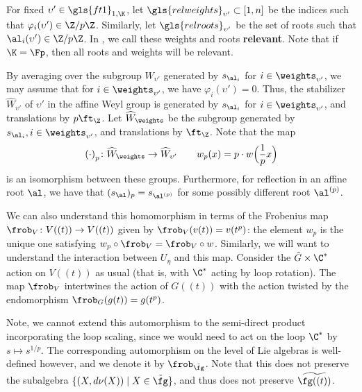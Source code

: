 For fixed $\upsilon'\in \gls{ft1}_{1,\K}$, let $\gls{relweights}_{\upsilon'}\subset
[1,n]$ be the indices such that $\varphi_i(\upsilon')\in \Z/p\Z$.
Similarly, let $\gls{relroots}_{\upsilon'}$ be the set of roots such that
$\al_i(\upsilon') \in \Z/p\Z$. 
In \cite[\S 4]{WebSD}, we call these weights and roots   {\bf
  relevant}.  Note that if $\K=\Fp$, then all roots and weights will
be relevant.   

By averaging over the subgroup $W_{\upsilon'}$ generated by $s_{\al_i}$ for $i\in \weights_{\upsilon'}$, we may assume that for $i
\in  \weights_{\upsilon'}$, we have $\varphi_i(\upsilon')=0$. Thus, the
stabilizer $\widehat{W}_{\upsilon'}$ of $\upsilon'$ in the affine Weyl
group is generated by $s_{\al_i}$ for $i\in \weights_{\upsilon'}$, and 
translations by $p \ft_{\Z}$.  Let $\widehat{W}_{ \weights}$
be the subgroup generated by $s_{\al_i}, i\in \weights_{\upsilon'}$, and 
translations by $\ft_{\Z}$.  Note that the map \[{(\cdot )}_p\colon \widehat{W}_{ \weights} \to \widehat{W}_{\upsilon'} \qquad w_p(x)= p\cdot w\Big(\frac{1}{p}x\Big)\]
is an isomorphism between these groups.  Furthermore, for reflection
in an affine root $\al$, we have that $(s_\al)_p=s_{\al^{(p)}}$ for
some possibly different root $\al^{(p)}$.  

We can also understand this homomorphism in terms of the Frobenius map $\frob_V\colon V((t))\to V((t))$ given by $\frob_V(v(t))=v(t^p)$: the element $w_p$ is the unique one satisfying $w_p\circ \frob_V=\frob_V \circ w$.  Similarly, we will want to understand the interaction between $U_{\eta}$ and this map.  Consider the $\tilde{G}\times \C^*$ action on $V((t))$ as usual (that is, with $\C^*$ acting by loop rotation).  The map $\frob_V$ intertwines the action of 
$G((t))$ with the action twisted by the endomorphism $\frob_G(g(t))=g(t^p)$.

Note, we cannot extend this automorphism to the semi-direct product incorporating the loop scaling, since we would need to act on the loop $\C^*$ by $s\mapsto s^{1/p}$.  The corresponding automorphism on the level of Lie algebras is well-defined however, and we denote it by $\frob_{\tilde{\fg}}$.   Note that this does not preserve the subalgebra $\{(X,d\nu(X))\mid X\in \tilde{\fg}\}$, and thus does not preserve $\widetilde{\fg((t))}$. 


